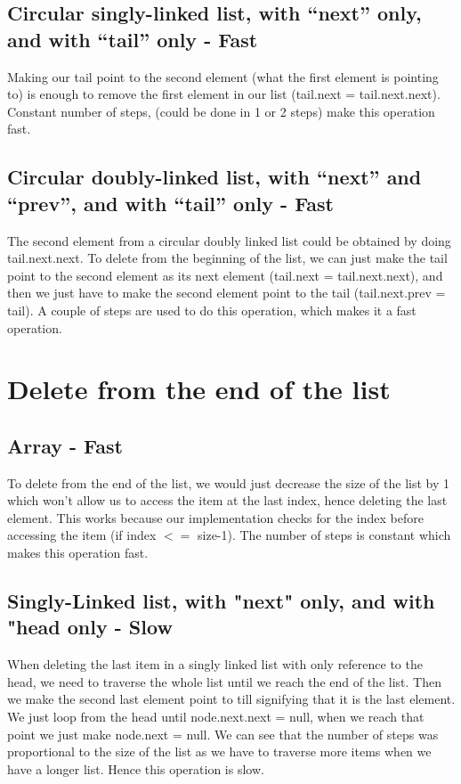 \documentclass{article}
\begin{document}
\subsection{Circular singly-linked list, with “next” only, and with “tail” only - Fast}
Making our tail point to the second element (what the first element is pointing to) is enough to remove the first element in our list (tail.next = tail.next.next). Constant number of steps, (could be done in 1 or 2 steps) make this operation fast. 

\subsection{Circular doubly-linked list, with “next” and “prev”, and with “tail” only - Fast}
The second element from a circular doubly linked list could be obtained by doing tail.next.next. To delete from the beginning of the list, we can just make the tail point to the second element as its next element (tail.next = tail.next.next), and then we just have to make the second element point to the tail (tail.next.prev = tail). A couple of steps are used to do this operation, which makes it a fast operation.




\section{Delete from the end of the list}
\subsection{Array - Fast}
To delete from the end of the list, we would just decrease the size of the list by 1 which won't allow us to access the item at the last index, hence deleting the last element. This works because our implementation checks for the index before accessing the item (if index $<=$ size-1). The number of steps is constant which makes this operation fast.


\subsection{Singly-Linked list, with "next" only, and with "head only - Slow}
When deleting the last item in a singly linked list with only reference to the head, we need to traverse the whole list until we reach the end of the list. Then we make the second last element point to till signifying that it is the last element. We just loop from the head until node.next.next = null, when we reach that point we just make node.next = null. We can see that the number of steps was proportional to the size of the list as we have to traverse more items when we have a longer list. Hence this operation is slow.
\end{document}
